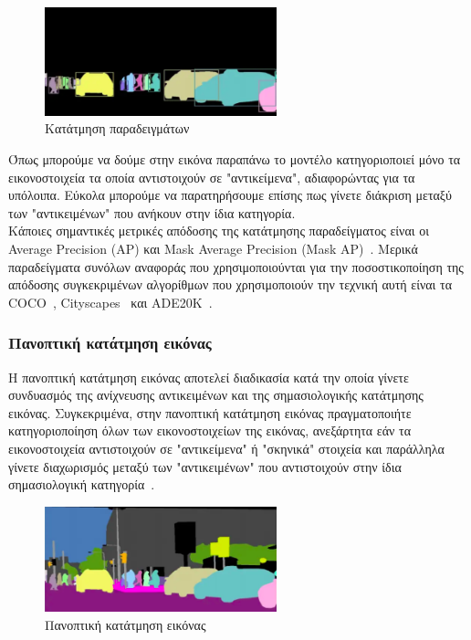 \documentclass[12pt]{article}
\numberwithin{equation}{section}
\begin{document}
\begin{figure}[h!]
  \centering
  \includegraphics[width=0.6\textwidth]{images/figure2.png} %
  \caption{Κατάτμηση παραδειγμάτων}
  \label{figure 3}
\end{figure}

Όπως μπορούμε να δούμε στην εικόνα παραπάνω το μοντέλο κατηγοριοποιεί μόνο τα εικονοστοιχεία τα οποία αντιστοιχούν σε "αντικείμενα", αδιαφορώντας για τα υπόλοιπα. Εύκολα μπορούμε να παρατηρήσουμε επίσης πως γίνετε διάκριση μεταξύ των "αντικειμένων" που ανήκουν στην ίδια κατηγορία.\\

Κάποιες σημαντικές μετρικές απόδοσης της κατάτμησης παραδείγματος είναι οι Average Precision (AP) και Mask Average Precision (Mask AP)~\cite{Hafiz_2020}. Μερικά παραδείγματα συνόλων αναφοράς που χρησιμοποιούνται για την ποσοστικοποίηση της απόδοσης συγκεκριμένων αλγορίθμων που χρησιμοποιούν την τεχνική αυτή είναι τα COCO~\cite{lin2015microsoftcococommonobjects}, Cityscapes~\cite{DBLP:journals/corr/CordtsORREBFRS16} και ADE20K~\cite{8100027}.

\subsubsection{Πανοπτική κατάτμηση εικόνας}

Η πανοπτική κατάτμηση εικόνας αποτελεί διαδικασία κατά την οποία γίνετε συνδυασμός της ανίχνευσης αντικειμένων και της σημασιολογικής κατάτμησης εικόνας. Συγκεκριμένα, στην πανοπτική κατάτμηση εικόνας πραγματοποιήτε κατηγοριοποίηση όλων των εικονοστοιχείων της εικόνας, ανεξάρτητα εάν τα εικονοστοιχεία αντιστοιχούν σε "αντικείμενα" ή "σκηνικά" στοιχεία και παράλληλα γίνετε διαχωρισμός μεταξύ των "αντικειμένων" που αντιστοιχούν στην ίδια σημασιολογική κατηγορία~\cite{elharrouss2021panopticsegmentationreview}.

\newpage

\begin{figure}[h!]
  \centering
  \includegraphics[width=0.6\textwidth]{images/figure3.png} %
  \caption{Πανοπτική κατάτμηση εικόνας}
  \label{figure 4}
\end{figure}
\end{document}
